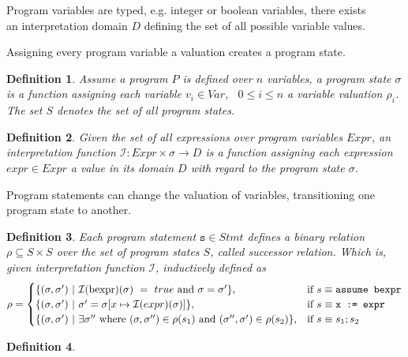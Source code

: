 \documentclass{article}
\newcommand{\Var}{\ensuremath{\mathit{Var}}\xspace}
\newcommand{\stmt}{\ensuremath{\mathit{Stmt}}\xspace}
\newcommand{\interpret}{\ensuremath{\mathcal{I}}\xspace}
\newtheorem{mydef}{Definition}
\newcommand\mycom[1]{}
\newcommand\mycom[1]{#1}
\newcommand{\jw}[1]{\mycom{\todo[color=blue!40,inline]{\small JW: #1}}}
\newcommand{\dd}[1]{\mycom{\todo[color=orange!40,inline]{\small DD: #1}}}
\newcommand{\ts}[1]{\mycom{\todo[color=green!40,inline]{\small TS: #1}}}
\begin{document}
Program variables are typed, e.g. integer or boolean variables, there exists \\
an interpretation domain $D$ defining the set of all possible variable values.
\jw{TODO}
Assigning every program variable a valuation creates a program state.


\begin{mydef}
	Assume a program $P$ is defined over $n$ variables, a program state $\sigma$ is a function assigning each variable $v_i \in \Var$, \ $0 \leq i \leq n$ a variable valuation $\rho_i$. The set $S$ denotes the set of all program states.
\end{mydef}


\begin{mydef}
	Given the set of all expressions over program variables $\mathit{Expr}$, an interpretation function $\interpret: Expr \times \sigma \rightarrow D$ is a function assigning each expression $expr \in \mathit{Expr}$ a value in its domain $D$ with regard to the program state $\sigma$.
\end{mydef}


\ts{What is an interpretation function?}
\dd{Perhaps you should explain what your interpretation function is :p}

Program statements can change the valuation of variables, transitioning one program state to another.

\begin{mydef}
	Each program statement $\texttt{s} \in \stmt$ defines a binary relation $\rho \subseteq S \times S$ over the set of program states $S$, called successor relation. Which is, given interpretation function $\mathcal{I}$, inductively defined as
	$$ \rho =
		\begin{cases}
			\{(\sigma, \sigma')\ |\ \mathcal{I}(\text{bexpr})(\sigma)\ =\ true\ \text{and}\ \sigma = \sigma'\} ,                                        & \text{if}\ s \equiv \text{\texttt{assume bexpr}} \\
			\{(\sigma, \sigma')\ |\ \sigma' = \sigma[x \mapsto \mathcal{I}(expr)(\sigma)]\} ,                                                           & \text{if}\ s \equiv \texttt{x := expr}           \\
			\{(\sigma, \sigma')\ |\ \exists \sigma''\ \text{where}\ (\sigma, \sigma'') \in \rho(s_1)\ \text{and}\ (\sigma'', \sigma') \in \rho(s_2) \}, & \text{if}\ s \equiv \texttt{$s_1;s_2$}
		\end{cases}
	$$
\end{mydef}
\begin{mydef}
	\jw{Sets of States.}
\end{mydef}
\end{document}
